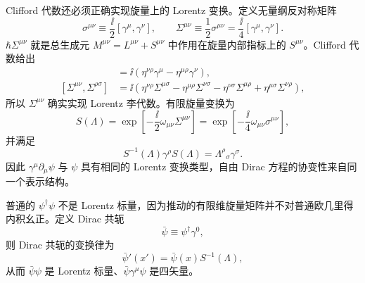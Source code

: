 Clifford 代数还必须正确实现旋量上的 Lorentz 变换。定义无量纲反对称矩阵
\begin{equation}
 \sigma^{\mu\nu}\equiv\frac{\ii}{2}[\gamma^\mu,\gamma^\nu],
 \qquad
 \Sigma^{\mu\nu}\equiv\frac12\sigma^{\mu\nu}
 =\frac{\ii}{4}[\gamma^\mu,\gamma^\nu].
 \label{eq:sigma-definition}
\end{equation}
$\hbar\Sigma^{\mu\nu}$ 就是总生成元 $M^{\mu\nu}=L^{\mu\nu}+S^{\mu\nu}$ 中作用在旋量内部指标上的 $S^{\mu\nu}$。Clifford 代数给出
\begin{align}
 [\Sigma^{\mu\nu},\gamma^\rho]
 &=\ii\left(\eta^{\nu\rho}\gamma^\mu
 -\eta^{\mu\rho}\gamma^\nu\right),
 \label{eq:sigma-gamma-comm}\\
 [\Sigma^{\mu\nu},\Sigma^{\rho\sigma}]
 &=\ii\left(
 \eta^{\nu\rho}\Sigma^{\mu\sigma}
 -\eta^{\mu\rho}\Sigma^{\nu\sigma}
 -\eta^{\nu\sigma}\Sigma^{\mu\rho}
 +\eta^{\mu\sigma}\Sigma^{\nu\rho}
 \right),
 \label{eq:spinor-lorentz-algebra}
\end{align}
所以 $\Sigma^{\mu\nu}$ 确实实现 Lorentz 李代数。有限旋量变换为
\begin{equation}
 S(\Lambda)=
 \exp\!\left[-\frac{\ii}{2}\omega_{\mu\nu}\Sigma^{\mu\nu}\right]
 =\exp\!\left[-\frac{\ii}{4}\omega_{\mu\nu}\sigma^{\mu\nu}\right],
 \label{eq:spinor-lorentz-transform}
\end{equation}
并满足
\begin{equation}
 \boxed{
 S^{-1}(\Lambda)\gamma^\rho S(\Lambda)
 =\Lambda^\rho{}_{\sigma}\gamma^\sigma.}
 \label{eq:gamma-covariance}
\end{equation}
因此 $\gamma^\mu\partial_\mu\psi$ 与 $\psi$ 具有相同的 Lorentz 变换类型，自由 Dirac 方程的协变性来自同一个表示结构。

普通的 $\psi^\dagger\psi$ 不是 Lorentz 标量，因为推动的有限维旋量矩阵并不对普通欧几里得内积幺正。定义 Dirac 共轭
\begin{equation}
 \boxed{\bar\psi\equiv\psi^\dagger\gamma^0,}
 \label{eq:dirac-adjoint}
\end{equation}
则 Dirac 共轭的变换律为
\begin{equation}
 \boxed{\bar\psi'(x')=\bar\psi(x)S^{-1}(\Lambda),}
 \label{eq:dirac-adjoint-covariance-dp68}
\end{equation}
从而 $\bar\psi\psi$ 是 Lorentz 标量、$\bar\psi\gamma^\mu\psi$ 是四矢量。

